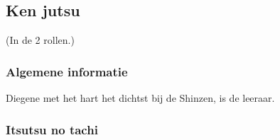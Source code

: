 
\newcommand{\suwaristart}{
Suwari houding. Rechterknie naar voor, linkerknie links onder een hoek van 45 graden. Hand open op het rechterbeen leggen, net voor de knie en met de handpalm naar boven gericht.\\
Linkerhand houdt de saya vast, met de wijsvinger achter de tsuba vanonder (zodat hij er niet kan uitvallen) en de duim er boven op, maar net iets meer langs de binnenkant. Je moet opletten dat je, bij het trekken van het zwaard, niet in je duim snijdt. En je duim (in combinatie met je wijsvinger) kan een boost geven aan de tsuba, zodat het handvat losklikt uit de saya en eruit schiet. Daarmee win je iets extra aan tijd.\\
Rechterhand komt boven je handvat en schuift 1 handlengte richting tsuba.\\
Dan draait de rechterhand om. Dit zou de perfecte lengte moeten zijn, zodat je het zwaard ineens kunt vastpakken net onder de tsuba.\\}

\newcommand{\suwaristop}{
Finale slag (en ondertussen "toooo" roepen). Dieper zakken.\\
Terug iets rechter kopen.\\
Zanshin.\\
Subari.\\
Not\-{o}.}

\newcommand{\pA}{De leraar}
\newcommand{\pB}{De leerling}
\newcommand{\pa}{de leraar}
\newcommand{\pb}{de leerling}

\subsection{Ken jutsu}
(In de 2 rollen.)

\subsubsection{Algemene informatie}

Diegene met het hart het dichtst bij de Shinzen, is de leeraar.\\

\subsubsection{Itsutsu no tachi}

